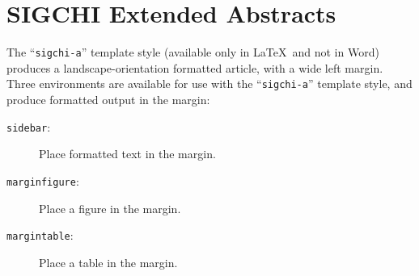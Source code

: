 \section{SIGCHI Extended Abstracts}

The ``\verb|sigchi-a|'' template style (available only in \LaTeX\ and
not in Word) produces a landscape-orientation formatted article, with
a wide left margin. Three environments are available for use with the
``\verb|sigchi-a|'' template style, and produce formatted output in
the margin:
\begin{description}
\item[\texttt{sidebar}:]  Place formatted text in the margin.
\item[\texttt{marginfigure}:] Place a figure in the margin.
\item[\texttt{margintable}:] Place a table in the margin.
\end{description}